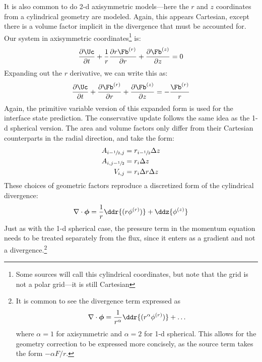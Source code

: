 It is also common to do 2-d axisymmetric models---here the $r$ and $z$
coordinates from a cylindrical geometry are modeled.  Again, this
appears Cartesian, except there is a volume factor implicit in the
divergence that must be accounted for.  Our system in axisymmetric
coordinates\footnote{Some sources will call this cylindrical
  coordinates, but note that the grid is not a polar grid---it is
  still Cartesian} is:
\begin{equation}
\frac{\partial \Uc}{\partial t}
  + \frac{1}{r}\frac{\partial r \Fb^{(r)}}{\partial r}
  + \frac{\partial \Fb^{(z)}}{\partial z} = 0
\end{equation}
Expanding out the $r$ derivative, we can write this as:
\begin{equation}
\frac{\partial \Uc}{\partial t}
  + \frac{\partial \Fb^{(r)}}{\partial r}
  + \frac{\partial \Fb^{(z)}}{\partial z} = -\frac{\Fb^{(r)}}{r}
\end{equation}
Again, the primitive variable version of this expanded form is used
for the interface state prediction.  The conservative update
follows the same idea as the 1-d spherical version.  The area
and volume factors only differ from their Cartesian counterparts
in the radial direction, and take the form:
\begin{align}
A_{i-{\sfrac{1}{2}},j} &= r_{i-{\sfrac{1}{2}}} \Delta z \\
A_{i,j-{\sfrac{1}{2}}} &= r_i \Delta z\\
V_{i,j} &= r_i \Delta r \Delta z
\end{align}
These choices of geometric factors reproduce a discretized
form of the cylindrical divergence:
\begin{equation}
\nabla \cdot {\boldsymbol{\phi}} = \frac{1}{r} \ddr{(r\phi^{(r)})} + \ddz{\phi^{(z)}}
\end{equation}
Just as with the 1-d spherical case, the pressure term in the momentum
equation needs to be treated separately from the flux, since it enters
as a gradient and not a divergence.\footnote{It is common to see the divergence
term expressed as
\begin{equation}
\nabla \cdot {\boldsymbol{\phi}} = \frac{1}{r^\alpha} \ddr{(r^\alpha \phi^{(r)})} + \ldots
\end{equation}
where $\alpha = 1$ for axisymmetric and $\alpha = 2$ for 1-d
spherical.  This allows for the geometry correction to be expressed
more concisely, as the source term takes the form $-\alpha F/r$.  }


